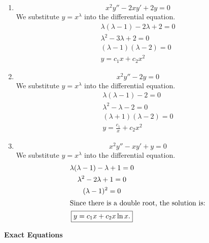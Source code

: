 {%
\begin{Solution}
  \label{solution x2y-2xy+2y=0}
  \begin{enumerate}
  \item
    \[
    x^2 y'' - 2 x y' + 2 y = 0
    \]
    We substitute $y = x^\lambda$ into the differential equation.
    \begin{gather*}
      \lambda (\lambda - 1) - 2 \lambda + 2 = 0 \\
      \lambda^2 - 3 \lambda + 2 = 0 \\
      (\lambda - 1)(\lambda - 2) = 0 \\
      \boxed{
        y = c_1 x + c_2 x^2
        }
    \end{gather*}
  \item
    \[
    x^2 y'' - 2 y = 0
    \]
    We substitute $y = x^\lambda$ into the differential equation.
    \begin{gather*}
      \lambda (\lambda - 1) - 2 = 0 \\
      \lambda^2 - \lambda - 2 = 0 \\
      (\lambda + 1)(\lambda - 2) = 0 \\
      \boxed{
        y = \frac{c_1}{x} + c_2 x^2
        }
    \end{gather*}
  \item
    \[
    x^2 y'' - x y' + y = 0
    \]
    We substitute $y = x^\lambda$ into the differential equation.
    \begin{gather*}
      \lambda (\lambda - 1) - \lambda + 1 = 0 \\
      \lambda^2 - 2 \lambda + 1 = 0 \\
      (\lambda - 1)^2 = 0 \\
      \intertext{Since there is a double root, the solution is:}
      \boxed{
        y = c_1 x + c_2 x \ln x.
        }
    \end{gather*}
  \end{enumerate}
\end{Solution}







\begin{large}
  \noindent
  \textbf{Exact Equations}
\end{large}



}
